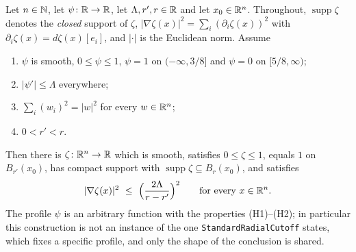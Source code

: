 \begin{helper}
Let $n\in\mathbb{N}$, let $\psi\colon\mathbb{R}\to\mathbb{R}$, let $\Lambda,r',r\in\mathbb{R}$ and let
$x_0\in\mathbb{R}^n$.  Throughout, $\operatorname{supp}\zeta$ denotes the \emph{closed}
support of $\zeta$, $|\nabla\zeta(x)|^2=\sum_i(\partial_i\zeta(x))^2$ with
$\partial_i\zeta(x)=d\zeta(x)[e_i]$, and $|\cdot|$ is the Euclidean norm.
Assume
\begin{enumerate}
\item[(H1)] $\psi$ is smooth, $0\le\psi\le1$, $\psi=1$ on $(-\infty,3/8]$ and
  $\psi=0$ on $[5/8,\infty)$;
\item[(H2)] $|\psi'|\le\Lambda$ everywhere;
\item[(H3)] $\sum_i(w_i)^2=|w|^2$ for every $w\in\mathbb{R}^n$;
\item[(H4)] $0<r'<r$.
\end{enumerate}
Then there is $\zeta\colon\mathbb{R}^n\to\mathbb{R}$ which is smooth, satisfies
$0\le\zeta\le1$, equals $1$ on $B_{r'}(x_0)$, has compact support with
$\operatorname{supp}\zeta\subseteq B_r(x_0)$, and satisfies
\[
|\nabla\zeta(x)|^2\ \le\ \Bigl(\frac{2\Lambda}{r-r'}\Bigr)^{2}
\qquad\text{for every }x\in\R^n .
\]
The profile $\psi$ is an arbitrary function with the properties (H1)--(H2); in
particular this construction is not an instance of the one
\texttt{StandardRadialCutoff} states, which fixes a specific profile, and only
the shape of the conclusion is shared.
\end{helper}
